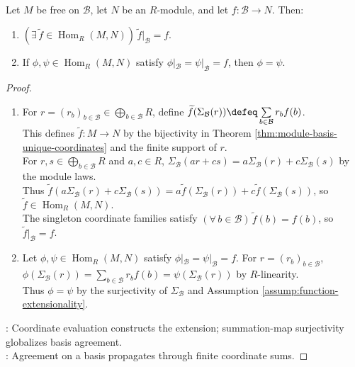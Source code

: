 \begin{theorem} \label{thm:free-module-map-extension} \\
Let $M$ be free on $\mathcal{B}$, let $N$ be an $R$-module, and let $f:\mathcal{B}\to N$. Then:
\begin{enumerate}[label=(\roman*)]
\setlength{\itemsep}{0pt}
\item $(\exists\,\widetilde{f}\in\operatorname{Hom}_R(M,N))\,\widetilde{f}|_{\mathcal{B}}=f$.
\item If $\phi,\psi\in\operatorname{Hom}_R(M,N)$ satisfy $\phi|_{\mathcal{B}}=\psi|_{\mathcal{B}}=f$, then $\phi=\psi$.
\end{enumerate}
\begin{proof}
\begin{enumerate}[label=(\roman*)]
\setlength{\itemsep}{0pt}
\item For $r=(r_b)_{b\in\mathcal{B}}\in\bigoplus\limits_{b\in\mathcal{B}}R$, define $\widetilde{f}(\Sigma_{\mathcal{B}}(r))\defeq\sum\limits_{b\in\mathcal{B}}r_bf(b)$.\\
This defines $\widetilde{f}:M\to N$ by the bijectivity in Theorem \ref{thm:module-basis-unique-coordinates} and the finite support of $r$.\\
For $r,s\in\bigoplus\limits_{b\in\mathcal{B}}R$ and $a,c\in R$, $\Sigma_{\mathcal{B}}(ar+cs)=a\Sigma_{\mathcal{B}}(r)+c\Sigma_{\mathcal{B}}(s)$ by the module laws.\\
Thus $\widetilde{f}(a\Sigma_{\mathcal{B}}(r)+c\Sigma_{\mathcal{B}}(s))=a\widetilde{f}(\Sigma_{\mathcal{B}}(r))+c\widetilde{f}(\Sigma_{\mathcal{B}}(s))$, so $\widetilde{f}\in\operatorname{Hom}_R(M,N)$.\\
The singleton coordinate families satisfy $(\forall\,b\in\mathcal{B})\,\widetilde{f}(b)=f(b)$, so $\widetilde{f}|_{\mathcal{B}}=f$.
\item Let $\phi,\psi\in\operatorname{Hom}_R(M,N)$ satisfy $\phi|_{\mathcal{B}}=\psi|_{\mathcal{B}}=f$. For $r=(r_b)_{b\in\mathcal{B}}$, $\phi(\Sigma_{\mathcal{B}}(r))=\sum\limits_{b\in\mathcal{B}}r_bf(b)=\psi(\Sigma_{\mathcal{B}}(r))$ by $R$-linearity.\\
Thus $\phi=\psi$ by the surjectivity of $\Sigma_{\mathcal{B}}$ and Assumption \ref{assump:function-extensionality}.
\end{enumerate}
: Coordinate evaluation constructs the extension; summation-map surjectivity globalizes basis agreement.\\
: Agreement on a basis propagates through finite coordinate sums.
\end{proof}
\end{theorem}

